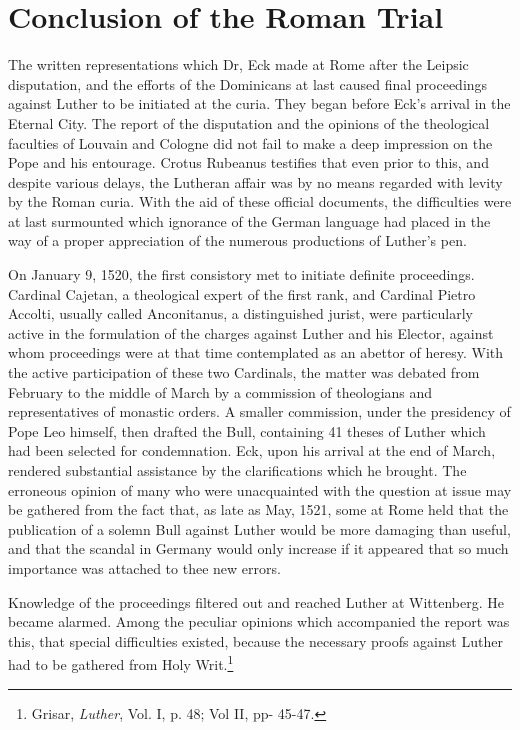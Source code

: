 \section{Conclusion of the Roman Trial}

The written representations which Dr, Eck made at Rome after the
Leipsic disputation, and the efforts of the Dominicans at last caused
final proceedings against Luther to be initiated at the curia. They
began before Eck’s arrival in the Eternal City. The report of the disputation
and the opinions of the theological faculties of Louvain and
Cologne did not fail to make a deep impression on the Pope and his
entourage. Crotus Rubeanus testifies that even prior to this, and despite
various delays, the Lutheran affair was by no means regarded
with levity by the Roman curia. With the aid of these official documents,
the difficulties were at last surmounted which ignorance of
the German language had placed in the way of a proper appreciation
of the numerous productions of Luther’s pen.

On January 9, 1520, the first consistory met to initiate definite
proceedings. Cardinal Cajetan, a theological expert of the first rank,
and Cardinal Pietro Accolti, usually called Anconitanus, a distinguished
jurist, were particularly active in the formulation of the
charges against Luther and his Elector, against whom proceedings
were at that time contemplated as an abettor of heresy. With the
active participation of these two Cardinals, the matter was debated
from February to the middle of March by a commission of theologians
and representatives of monastic orders. A smaller commission, under
the presidency of Pope Leo himself, then drafted the Bull, containing
41 theses of Luther which had been selected for condemnation. Eck,
upon his arrival at the end of March, rendered substantial assistance
by the clarifications which he brought. The erroneous opinion of
many who were unacquainted with the question at issue may be
gathered from the fact that, as late as May, 1521, some at Rome held
that the publication of a solemn Bull against Luther would be more
damaging than useful, and that the scandal in Germany would only
increase if it appeared that so much importance was attached to thee
new errors.

Knowledge of the proceedings filtered out and reached Luther at
Wittenberg. He became alarmed. Among the peculiar opinions which
accompanied the report was this, that special difficulties existed, because
the necessary proofs against Luther had to be gathered from
Holy Writ.\footnote{Grisar, \textit{Luther}, Vol. I, p. 48; Vol II, pp- 45-47.}

